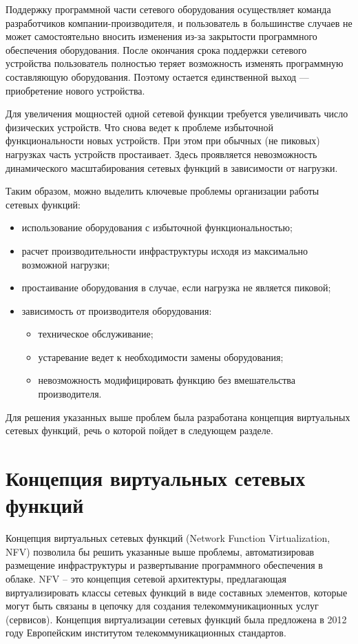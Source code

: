 \documentclass[oneside,final,14pt,a4paper]{extreport}
\begin{document}
Поддержку программной части сетевого оборудования осуществляет команда разработчиков компании-производителя, и пользователь в большинстве случаев не может самостоятельно вносить изменения из-за закрытости программного обеспечения оборудования. После окончания срока поддержки сетевого устройства пользователь полностью теряет возможность изменять программную составляющую оборудования. Поэтому остается единственной выход --- приобретение нового устройства.

Для увеличения мощностей одной сетевой функции требуется увеличивать число физических устройств. Что снова ведет к проблеме избыточной функциональности новых устройств. При этом при обычных (не пиковых) нагрузках часть устройств простаивает. Здесь проявляется невозможность динамического масштабирования сетевых функций в зависимости от нагрузки.

Таким образом, можно выделить ключевые проблемы организации работы сетевых функций:
\begin{itemize}
	\item использование оборудования с избыточной функциональностью;
	\item расчет производительности инфраструктуры исходя из максимально возможной нагрузки;
	\item простаивание оборудования в случае, если нагрузка не является пиковой;
	\item зависимость от производителя оборудования:
	\begin{itemize}
	    \item техническое обслуживание;
	    \item устаревание ведет к необходимости замены оборудования;
	    \item невозможность модифицировать функцию без вмешательства производителя.
	\end{itemize}
\end{itemize}

Для решения указанных выше проблем была разработана концепция виртуальных сетевых функций, речь о которой пойдет в следующем разделе. 




\chapter{Концепция виртуальных сетевых функций}
\label{chap:nfv}
Концепция виртуальных сетевых функций (Network Function Virtualization, NFV\cite{bib:nfv:white-paper}) позволила бы решить указанные выше проблемы, автоматизировав размещение инфраструктуры и развертывание программного обеспечения в облаке. NFV -- это концепция сетевой архитектуры, предлагающая виртуализировать классы сетевых функций в виде составных элементов, которые могут быть связаны в цепочку для создания телекоммуникационных услуг (сервисов). Концепция виртуализации сетевых функций была предложена в 2012 году Европейским институтом телекоммуникационных стандартов\cite{bib:nfv:white-paper}.
\end{document}
